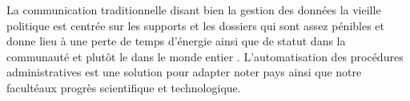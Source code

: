 \documentclass{article}
\begin{document}
La communication traditionnelle disant bien la gestion des données la vieille politique est centrée sur les supports et les dossiers qui sont assez pénibles et donne lieu à une perte de temps d'énergie ainsi que de statut dans la communauté et plutôt le dans le monde entier . L'automatisation des procédures administratives est une solution pour adapter noter pays ainsi que notre facultéaux progrès scientifique et  technologique.
\end{document}
